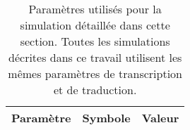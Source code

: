 \label{app:params}

\begin{table}[h!]
\begin{center}
\begin{tabular}{p{7cm} c p{6cm}}
\hline 
Paramètre & Symbole & Valeur \\
\hline
\hline
\end{tabular}
\caption{Paramètres utilisés pour la simulation détaillée dans cette section. Toutes les simulations décrites dans ce travail utilisent les mêmes paramètres de transcription et de traduction. \label{tab:param}}
\end{center}
\end{table}


\clearemptydoublepage